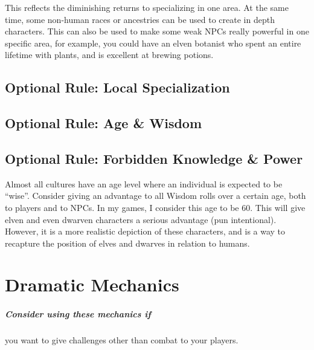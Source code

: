 \documentclass[twocolumn]{dndbook}
\begin{document}
This reflects the diminishing returns to specializing in one area.
At the same time, some non-human races or ancestries can be used to create in depth characters.
This can also be used to make some weak NPCs really powerful in one specific area,
for example, you could have an elven botanist who spent an entire lifetime with plants, and is excellent at brewing potions.\par



\section{Optional Rule: Local Specialization}


\section{Optional Rule: Age \& Wisdom}

\section{Optional Rule: Forbidden Knowledge \& Power}

Almost all cultures have an age level where an individual is expected to be ``wise''.
Consider giving an advantage to all Wisdom rolls over a certain age, both to players and to NPCs.
In my games, I consider this age to be 60.
This will give elven and even dwarven characters a serious advantage (pun intentional).
However, it is a more realistic depiction of these characters, and is a way to recapture the position of elves and dwarves in relation to humans.


\chapter{Dramatic Mechanics}

\begin{emphasisParagraph}
	\paragraph*{Consider using these mechanics if} you want to give challenges other than combat to your players.
\end{emphasisParagraph}
\end{document}
